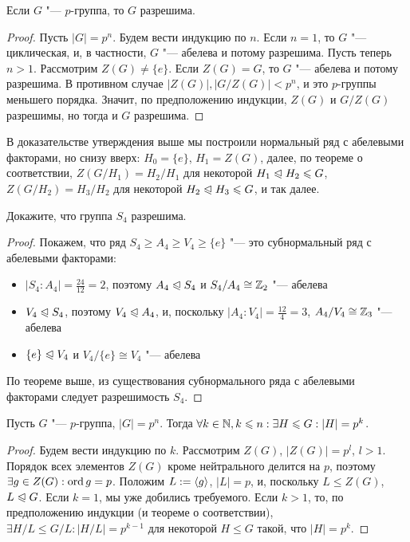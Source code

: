 \begin{proposition}
	Если $G$ "--- $p$-группа, то $G$ разрешима.
\end{proposition}

\begin{proof}
	Пусть $|G| = p^n$. Будем вести индукцию по $n$. Если $n = 1$, то $G$ "--- циклическая, и, в частности, $G$ "--- абелева и потому разрешима. Пусть теперь $n > 1$. Рассмотрим $Z(G) \ne \{e\}$. Если $Z(G) = G$, то $G$ "--- абелева и потому разрешима. В противном случае $|Z(G)|, |G/Z(G)| < p^n$, и это $p$-группы меньшего порядка. Значит, по предположению индукции, $Z(G)$ и $G/Z(G)$ разрешимы, но тогда и $G$ разрешима.
\end{proof}

\begin{note}
	В доказательстве утверждения выше мы построили нормальный ряд с абелевыми факторами, но снизу вверх: $H_0 = \{e\}$, $H_1 = Z(G)$, далее, по теореме о соответствии, $Z(G/H_1) = H_2/H_1$ для некоторой $H_1 \trianglelefteqslant H_2 \leqslant G$, $Z(G/H_2) = H_3/H_2$ для некоторой $H_2 \trianglelefteqslant H_3 \leqslant G$, и так далее.
\end{note}

\begin{exercise}
	Докажите, что группа $S_4$ разрешима.
\end{exercise}

\begin{proof}
	Покажем, что ряд $S_4 \ge A_4 \ge V_4 \ge \{e\}$ "--- это субнормальный ряд с абелевыми факторами:
	\begin{itemize}
		\item $|S_4 : A_4| = \frac{24}{12} = 2$, поэтому $A_4 \trianglelefteqslant S_4$ и $S_4/A_4 \cong \mathbb{Z}_2$ "--- абелева
		\item $V_4 \trianglelefteqslant S_4$, поэтому $V_4 \trianglelefteqslant A_4$, и, поскольку $|A_4 : V_4| = \frac{12}{4} = 3$, $A_4/V_4 \cong \mathbb{Z}_3$ "--- абелева
		\item $\{e\} \trianglelefteqslant V_4$ и $V_4/\{e\} \cong V_4$ "--- абелева
	\end{itemize}
	
	По теореме выше, из существования субнормального ряда с абелевыми факторами следует разрешимость $S_4$.
\end{proof}

\begin{theorem}
	Пусть $G$ "--- $p$-группа, $|G| = p^n$. Тогда $\forall k \in \mathbb{N}, k \leqslant n: \exists H \leqslant G: |H| = p^k$.
\end{theorem}

\begin{proof}
	Будем вести индукцию по $k$. Рассмотрим $Z(G)$, $|Z(G)| = p^l$, $l > 1$. Порядок всех элементов $Z(G)$ кроме нейтрального делится на $p$, поэтому $\exists g \in Z(G): \operatorname{ord}{g} = p$. Положим $L := \langle g\rangle$, $|L| = p$, и, поскольку $L \le Z(G)$, $L \trianglelefteqslant G$. Если $k = 1$, мы уже добились требуемого. Если $k > 1$, то, по предположению индукции (и теореме о соответствии), $\exists H / L \le G / L: |H / L| = p^{k-1}$ для некоторой $H \le G$ такой, что $|H| = p^k$.
\end{proof}


